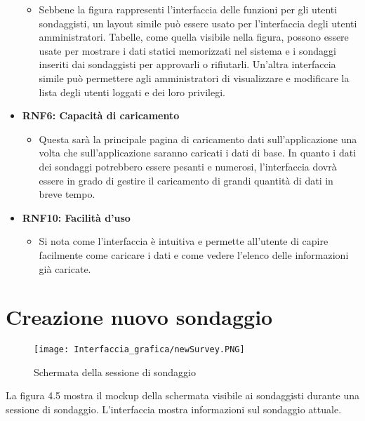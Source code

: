 \begin{itemize}
\begin{itemize}
            \item Sebbene la figura rappresenti l'interfaccia delle funzioni per gli utenti sondaggisti, un layout simile può essere usato per l'interfaccia degli utenti amministratori. Tabelle, come quella visibile nella figura, possono essere usate per mostrare i dati statici memorizzati nel sistema e i sondaggi inseriti dai sondaggisti per approvarli o rifiutarli. Un'altra interfaccia simile può permettere agli amministratori di visualizzare e modificare la lista degli utenti loggati e dei loro privilegi.
        \end{itemize} 
        \item \textbf{RNF6: Capacità di caricamento} \begin{itemize}
            \item Questa sarà la principale pagina di caricamento dati sull'applicazione una volta che sull'applicazione saranno caricati i dati di base. In quanto i dati dei sondaggi potrebbero essere pesanti e numerosi, l'interfaccia dovrà essere in grado di gestire il caricamento di grandi quantità di dati in breve tempo.
        \end{itemize}
        \item \textbf{RNF10: Facilità d’uso} \begin{itemize}
            \item Si nota come l'interfaccia è intuitiva e permette all'utente di capire facilmente come caricare i dati e come vedere l'elenco delle informazioni già caricate.
        \end{itemize}
    \end{itemize}




\section{Creazione nuovo sondaggio}

    \begin{figure}[H]
        \center
        \texttt{[image: Interfaccia\_grafica/newSurvey.PNG]}
        \caption{Schermata della sessione di sondaggio}
    \end{figure}

    La figura 4.5 mostra il mockup della schermata visibile ai sondaggisti durante una sessione di sondaggio. L'interfaccia mostra informazioni sul sondaggio attuale.

